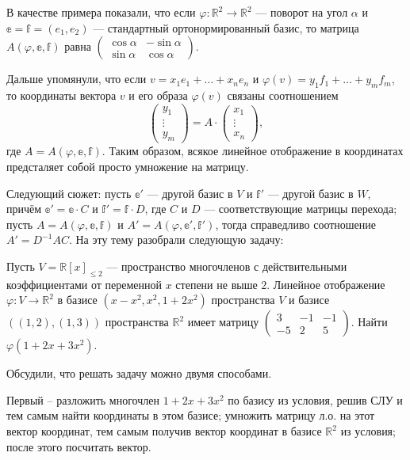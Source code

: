 \documentclass[10pt, a4paper]{extarticle}
\def \R{\mathbb{R}}
\theoremstyle{definition}
\begin{document}
В качестве примера показали, что если $\varphi \colon \R^2 \to \R^2$ --- поворот на угол $\alpha$ и $\mathbb{e} = \mathbb f = (e_1,e_2)$ --- стандартный 
ортонормированный базис, то матрица $A(\varphi, \mathbb e, \mathbb f)$ равна 
$\begin{pmatrix} \cos \alpha & - \sin \alpha \\ \sin \alpha & \cos \alpha \end{pmatrix}$.

Дальше упомянули, что если $v = x_1e_1+\dots+x_ne_n$ и $\varphi(v) = y_1f_1+ \dots + y_m f_m$, то координаты вектора $v$ и его образа $\varphi(v)$ 
связаны соотношением
\[
\begin{pmatrix} y_1 \\ \vdots \\ y_m \end{pmatrix} = A \cdot \begin{pmatrix} x_1 \\ \vdots \\ x_n \end{pmatrix},
\]
где $A = A(\varphi, \mathbb e, \mathbb f)$.
Таким образом, всякое линейное отображение в координатах предсталяет собой просто умножение на матрицу.

Следующий сюжет: пусть $\mathbb e'$ --- другой базис в $V$ и $\mathbb f'$ --- другой базис в $W$, причём $\mathbb e' = \mathbb e \cdot C$ и 
$\mathbb f' = \mathbb f \cdot D$, где $C$ и $D$ --- соответствующие матрицы перехода; пусть $A = A(\varphi, \mathbb e, \mathbb f)$ и 
$A' = A(\varphi, \mathbb e', \mathbb f')$, тогда справедливо соотношение $A' = D^{-1}AC$.
На эту тему разобрали следующую задачу:

Пусть $V = \R[x]_{\leqslant 2}$ --- пространство многочленов с действительными коэффициентами от переменной $x$ степени не выше $2$. 
Линейное отображение $\varphi \colon V \to \R^2$ в базисе $(x-x^2,x^2,1+2x^2)$ пространства $V$ и базисе $((1,2),(1,3))$ пространства $\R^2$ имеет матрицу
\(
\begin{pmatrix}
3 & -1 & -1 \\
-5 & 2 & 5
\end{pmatrix}.
\)
Найти $\varphi(1+2x+3x^2)$.

Обсудили, что решать задачу можно двумя способами. 

Первый -- разложить многочлен $1+2x+3x^2$ по базису из условия, решив СЛУ и тем самым найти координаты 
в этом базисе; умножить матрицу л.о. на этот вектор координат, тем самым получив вектор координат в базисе $\R^2$ из условия; после этого посчитать вектор.
\end{document}
